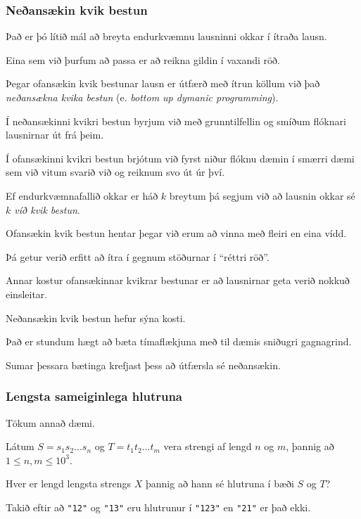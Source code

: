 {
	\frametitle{Neðansækin kvik bestun}
	{
		\item<1-> Það er þó lítið mál að breyta endurkvæmnu lausninni okkar í ítraða lausn.
		\item<2-> Eina sem við þurfum að passa er að reikna gildin í vaxandi röð.
		\item<3->[]
		\item<4-> Þegar ofansækin kvik bestunar lausn er útfærð með ítrun köllum við það \emph{neðansækna kvika bestun} 
					(e. \emph{bottom up dymanic programming}).
	}
}

{
	{
		\item<1-> Í neðansækinni kvikri bestun byrjum við með grunntilfellin og smíðum flóknari lausnirnar út frá þeim.
		\item<2-> Í ofansækinni kvikri bestun brjótum við fyrst niður flóknu dæmin í smærri dæmi sem við vitum svarið við og reiknum svo út úr því.
		\item<3-> Ef endurkvæmnafallið okkar er háð $k$ breytum þá segjum við að lausnin okkar sé \emph{$k$ víð kvik bestun}.
		\item<4-> Ofansækin kvik bestun hentar þegar við erum að vinna með fleiri en eina vídd.
		\item<5-> Þá getur verið erfitt að ítra í gegnum stöðurnar í ``réttri röð''.
	}
}

{
	{
		\item<1-> Annar kostur ofansækinnar kvikrar bestunar er að lausnirnar geta verið nokkuð einsleitar.
		\item<2->[] 
	}
}

{
	{
		\item<1-> Neðansækin kvik bestun hefur sýna kosti.
		\item<2-> Það er stundum hægt að bæta tímaflækjuna með til dæmis sniðugri gagnagrind.
		\item<3-> Sumar þessara bætinga krefjast þess að útfærsla sé neðansækin.
	}
}

{
	\frametitle{Lengsta sameiginlega hlutruna}
	{
		\item<1-> Tökum annað dæmi.
		\item<2-> Látum $S = s_1s_2...s_n$ og $T = t_1t_2...t_m$ vera strengi af lengd $n$ og $m$, þannig að $1 \leq n, m \leq 10^3$.
		\item<3-> Hver er lengd lengsta strengs $X$ þannig að hann sé hlutruna í bæði $S$ og $T$?
		\item<4-> Takið eftir að \texttt{"12"} og \texttt{"13"} eru hlutrunur í \texttt{"123"} en \texttt{"21"} er það ekki.
	}
}

